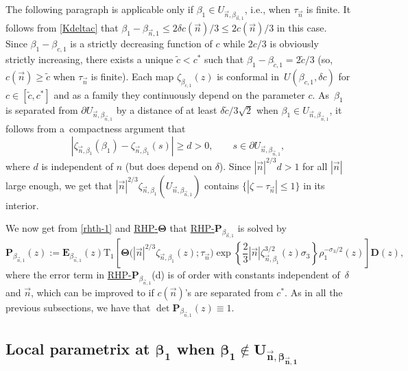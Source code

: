 \documentclass[pdftex]{sigma}
\numberwithin{equation}{section}
\renewcommand{\det}{\operatorname{det}}
\newcommand{\n}{{\vec n}}
\newcommand{\rhp} {\textnormal{RHP}-${\boldsymbol P}$}
\newcommand{\rhth} {\textnormal{RHP}-${\boldsymbol \Theta}$}
\begin{document}
The following paragraph is applicable only if $ \beta_1 \in U_{\n,\beta_{\n,1}} $, i.e., when $ \tau_\n $ is finite. It follows from \eqref{Kdeltac} that $ \beta_1-\beta_{\n,1}\leq 2\delta c(\n)/3\leq 2c(\n)/3$ in this case. Since $ \beta_1-\beta_{c,1} $ is a strictly decreasing function of $ c $ while $ 2c/3 $ is obviously strictly increasing, there exists a unique $ \tilde c<c^* $ such that $ \beta_1-\beta_{\tilde c,1} = 2\tilde c/3$ (so, $ c(\n)\geq \tilde c $ when $ \tau_\n $ is finite). Each map $ \zeta_{\beta_{c,1}}(z) $ is conformal in~$ U(\beta_{c,1},\delta c) $ for $ c\in[\tilde c,c^*] $ and as a family they continuously depend on the parameter $ c $. As~$ \beta_1 $ is separated from $ \partial U_{\n,\beta_{\n,1}} $ by a distance of at least $ \delta \tilde c/3\sqrt2 $ when $ \beta_1\in U_{\n,\beta_{\n,1}} $, it follows from a~compactness argument that
\[
|\zeta_{\n,\beta_1}(\beta_1)-\zeta_{\n,\beta_1}(s)| \geq d>0, \qquad s\in \partial U_{\n,\beta_{\n,1}},
\]
where $ d $ is independent of $ n $ (but does depend on $ \delta $). Since $ |\n|^{2/3}d>1 $ for all $ |\n| $ large enough, we get that $ |\n|^{2/3}\zeta_{\n,\beta_1}(U_{\n,\beta_{\n,1}} ) $ contains $ \{|\zeta-\tau_\n|\leq 1\} $ in its interior.

We now get from \eqref{rhth-1} and \hyperref[rhth]{\rhth} that \hyperref[rhp]{\rhp$_{\beta_{\n,1}}$} is solved by
\begin{equation}
\label{rhth-2}
\boldsymbol P_{\beta_{\n,1}}(z) := \boldsymbol E_{\beta_{\n,1}}(z) \mathrm{T}_1\left[ \boldsymbol\Theta\bigl(|\n|^{2/3}\zeta_{\n,\beta_1}(z);\tau_\n\bigr) \exp\left\{\frac23|\n|\zeta_{\n,\beta_1}^{3/2}(z)\sigma_3 \right\} \rho_1^{-\sigma_3/2}(z) \right] \boldsymbol D(z),
\end{equation}
where the error term in \hyperref[rhp]{\rhp$_{\beta_{\n,1}}$}(d) is of order  with constants independent of~$ \delta $ and $ \n $, which can be improved to  if $ c(\n) $'s are separated from $ c^* $. As in all the previous subsections, we have that $ \det \boldsymbol P_{\beta_{\n,1}}(z) \equiv 1 $.


\subsection[Local parametrix at beta\_1 when]{Local parametrix at $ \boldsymbol{\beta_1} $ when $\boldsymbol{\beta_1 \notin U_{\n,\beta_{\n,1}} }$}
\end{document}
